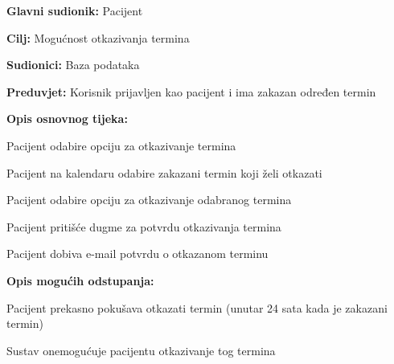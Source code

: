 					\noindent {}
					\begin{packed_item}
						
						\item \textbf{Glavni sudionik: }Pacijent
						\item  \textbf{Cilj:} Mogućnost otkazivanja termina 
						\item  \textbf{Sudionici:} Baza podataka
						\item  \textbf{Preduvjet:} Korisnik prijavljen kao pacijent i ima zakazan određen termin
						\item  \textbf{Opis osnovnog tijeka:}
						
						\item[] \begin{packed_enum}
							
							\item Pacijent odabire opciju za otkazivanje termina
							\item Pacijent na kalendaru odabire zakazani termin koji želi otkazati
							\item Pacijent odabire opciju za otkazivanje odabranog termina
							\item Pacijent pritišće dugme za potvrdu otkazivanja termina
							\item Pacijent dobiva e-mail potvrdu o otkazanom terminu
						\end{packed_enum}
						
						\item  \textbf{Opis mogućih odstupanja:}
						
						\item[] \begin{packed_item}
							
							\item[3.a] Pacijent prekasno pokušava otkazati termin (unutar 24 sata kada je zakazani termin)
							\item[] \begin{packed_enum}
								
								\item Sustav onemogućuje pacijentu otkazivanje tog termina
								
							\end{packed_enum}
							
						\end{packed_item}
					\end{packed_item}
					
